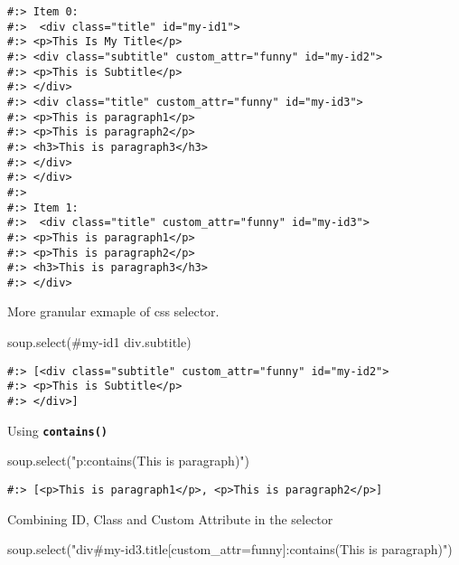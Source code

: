 \documentclass[
]{book}
\newenvironment{Shaded}{\begin{snugshade}}{\end{snugshade}}
\newcommand{\NormalTok}[1]{#1}
\newcommand{\StringTok}[1]{\textcolor[rgb]{0.5,0.5,0.5}{#1}}
\begin{document}
\begin{verbatim}
#:> Item 0: 
#:>  <div class="title" id="my-id1">
#:> <p>This Is My Title</p>
#:> <div class="subtitle" custom_attr="funny" id="my-id2">
#:> <p>This is Subtitle</p>
#:> </div>
#:> <div class="title" custom_attr="funny" id="my-id3">
#:> <p>This is paragraph1</p>
#:> <p>This is paragraph2</p>
#:> <h3>This is paragraph3</h3>
#:> </div>
#:> </div> 
#:> 
#:> Item 1: 
#:>  <div class="title" custom_attr="funny" id="my-id3">
#:> <p>This is paragraph1</p>
#:> <p>This is paragraph2</p>
#:> <h3>This is paragraph3</h3>
#:> </div>
\end{verbatim}

More granular exmaple of css selector.

\begin{Shaded}
\begin{Highlighting}[]
\NormalTok{soup.select(}\StringTok{\textquotesingle{}\#my{-}id1 div.subtitle\textquotesingle{}}\NormalTok{)}
\end{Highlighting}
\end{Shaded}

\begin{verbatim}
#:> [<div class="subtitle" custom_attr="funny" id="my-id2">
#:> <p>This is Subtitle</p>
#:> </div>]
\end{verbatim}

Using \textbf{\texttt{contains()}}

\begin{Shaded}
\begin{Highlighting}[]
\NormalTok{soup.select(}\StringTok{"p:contains(\textquotesingle{}This is paragraph\textquotesingle{})"}\NormalTok{)}
\end{Highlighting}
\end{Shaded}

\begin{verbatim}
#:> [<p>This is paragraph1</p>, <p>This is paragraph2</p>]
\end{verbatim}

Combining ID, Class and Custom Attribute in the selector

\begin{Shaded}
\begin{Highlighting}[]
\NormalTok{soup.select(}\StringTok{"div\#my{-}id3.title[custom\_attr=\textquotesingle{}funny\textquotesingle{}]:contains(\textquotesingle{}This is paragraph\textquotesingle{})"}\NormalTok{)}
\end{Highlighting}
\end{Shaded}
\end{document}
